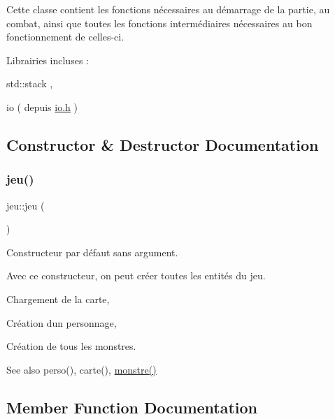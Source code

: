 Cette classe contient les fonctions nécessaires au démarrage de la partie, au combat, ainsi que toutes les fonctions intermédiaires nécessaires au bon fonctionnement de celles-\/ci.

Librairies incluses \+:
\begin{DoxyItemize}
\item std\+::stack ,
\item io ( depuis \hyperlink{io_8h_source}{io.\+h} ) 
\end{DoxyItemize}

\subsection{Constructor \& Destructor Documentation}
\mbox{\label{classjeu_a38513a7bfd0a7ea4e3a5612da2856016}} 
\subsubsection{\texorpdfstring{jeu()}{jeu()}}
{\footnotesize\ttfamily jeu\+::jeu (\begin{DoxyParamCaption}{ }\end{DoxyParamCaption})}



Constructeur par défaut sans argument. 

Avec ce constructeur, on peut créer toutes les entités du jeu.


\begin{DoxyItemize}
\item Chargement de la carte,
\item Création d\textquotesingle{}un personnage,
\item Création de tous les monstres.
\end{DoxyItemize}

\begin{DoxySeeAlso}{See also}
perso(), carte(), \hyperlink{classmonstre}{monstre()} 
\end{DoxySeeAlso}


\subsection{Member Function Documentation}
\mbox{\label{classjeu_aabf11934ce63bc5d71bbd27e1523fc45}} 
